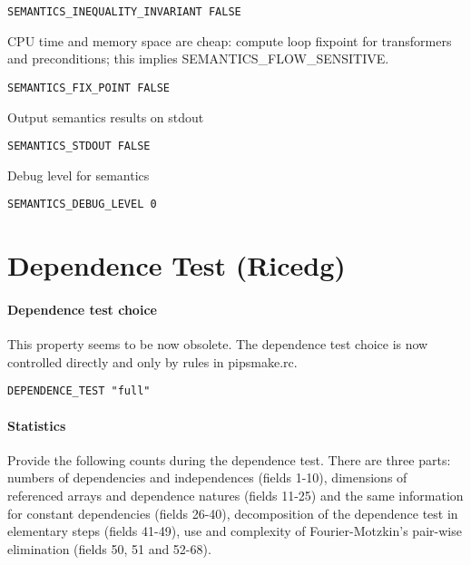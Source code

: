 \begin{verbatim}
SEMANTICS_INEQUALITY_INVARIANT FALSE
\end{verbatim}

CPU time and memory space are cheap: compute loop fixpoint for
transformers and preconditions; this implies SEMANTICS\_FLOW\_SENSITIVE.

\begin{verbatim}
SEMANTICS_FIX_POINT FALSE
\end{verbatim}

Output semantics results on stdout

\begin{verbatim}
SEMANTICS_STDOUT FALSE
\end{verbatim}

Debug level for semantics

\begin{verbatim}
SEMANTICS_DEBUG_LEVEL 0
\end{verbatim}

\section{Dependence Test (Ricedg)}


\paragraph{Dependence test choice}

This property seems to be now obsolete. The dependence test choice is
now controlled directly and only by rules in pipsmake.rc.

\begin{verbatim}
DEPENDENCE_TEST "full"
\end{verbatim}

\paragraph{Statistics}

Provide the following counts during the dependence test. There are three
parts: numbers of dependencies and independences (fields 1-10),
dimensions of referenced arrays and dependence natures (fields 11-25)
and the same information for constant dependencies (fields 26-40),
decomposition of the dependence test in elementary steps (fields 41-49),
use and complexity of Fourier-Motzkin's pair-wise elimination (fields
50, 51 and 52-68).

